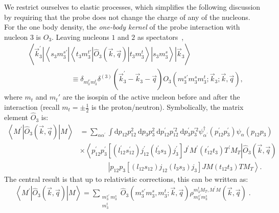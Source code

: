 \documentclass[a4paper,11pt]{article}
\newcommand\bv[1]{\vec{#1}}
\begin{document}
We restrict ourselves to elastic processes, which simplifies the
following discussion by requiring that the probe does not change the
charge of any of the nucleons.
For the one body density, the \textit{one-body kernel} of the probe
interaction with nucleon 3 is $O_3$. Leaving nucleons $1$ and $2$ as
spectators~\cite{hammer2020},
\begin{align}
  &\left\langle\bv{k}_{3}^{\prime}\left|\left\langle s_{3} m_{3}^{s
  \prime}\left|\left\langle t_{3} m_{3}^{t
  \prime}\left|\hat{O}_{3}(\bv{k}, \bv{q})\right| t_{3}
  m_{3}^{t}\right\rangle\right| s_{3} m_{3}^{s}\right\rangle\right|
  \bv{k}_{3}\right\rangle \nonumber\\
  &\qquad\qquad\qquad \equiv \delta_{m_{3}^{t \prime} m_{3}^{t}}
  \delta^{(3)}\left(\bv{k}_{3}^{\prime}-\bv{k}_{3}-\bv{q}\right)
  O_{3}\left(m_{3}^{s \prime} m_{3}^{s} m_{3}^{t} ; \bv{k}_{3} ;
  \bv{k}, \bv{q}\right),\label{dirac}
\end{align}
where $m_t$ and $m_t'$ are the isospin of the active nucleon before
and after the interaction (recall $m_t= \pm \frac{1}{2}$ is the proton/neutron).
Symbolically, the matrix element $\hat{O}_3$ is:
\begin{align}
  \left\langle M^{\prime}\left|\hat{O}_{3}(\bv{k}, \bv{q})\right|
  M\right\rangle&=\sum_{\alpha \alpha^{\prime}} \int \mathrm{d}
  p_{12} p_{12}^{2} \mathrm{~d} p_{3} p_{3}^{2} \mathrm{~d}
  p_{12}^{\prime} p_{12}^{\prime 2} \mathrm{~d} p_{3}^{\prime}
  p_{3}^{\prime 2}
  \psi_{\alpha^{\prime}}^{\dagger}\left(p_{12}^{\prime}
  p_{3}^{\prime}\right) \psi_{\alpha}\left(p_{12} p_{3}\right)\nonumber \\
  &\times\left\langle p_{12}^{\prime}
  p_{3}^{\prime}\left[\left(l_{12}^{\prime} s_{12}^{\prime}\right)
    j_{12}^{\prime}\left(l_{3}^{\prime} s_{3}\right)
  j_{3}^{\prime}\right] J^{\prime} M^{\prime}\left(t_{12}^{\prime}
  t_{3}\right) T^{\prime} M_{T}\right| \hat{O}_{3}(\bv{k}, \bv{q})
  \label{onebodyExplicit}\\
  &\qquad\qquad\left|p_{12} p_{3}\left[\left(l_{12} s_{12}\right)
  j_{12}\left(l_{3} s_{3}\right) j_{3}\right] J M\left(t_{12}
  t_{3}\right) T M_{T}\right\rangle.\nonumber
\end{align}
The central result is that up to relativistic corrections, this can
be written as:
\begin{align}
  \left\langle M^{\prime}\left|\hat{O}_{3}(\bv{k}, \bv{q})\right|
  M\right\rangle=\sum_{\substack{m_{3}^{s \prime}\,
  m_{3}^{s}\\m_3^t}}\hat{O}_{3}\left(m_{3}^{s \prime} m_{3}^{s},
  m_{3}^{t} ;  \bv{k}, \bv{q}\right) \rho_{m_{3}^{s \prime}
  m_{3}^{s}}^{m_3^{t} M_{T}, M^{\prime} M}(\bv{k}, \bv{q})\label{onebodyOrig}\;.
\end{align}
\end{document}
